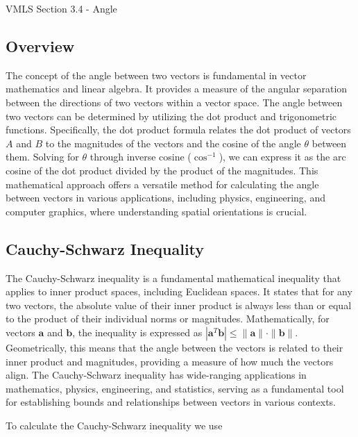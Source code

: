 \begin{notes}{VMLS Section 3.4 - Angle}
    \subsection*{Overview}

    The concept of the angle between two vectors is fundamental in vector mathematics and linear algebra. It provides a measure of the angular separation between the directions of two vectors within a vector space. The 
    angle between two vectors can be determined by utilizing the dot product and trigonometric functions. Specifically, the dot product formula relates the dot product of vectors \(A\) and \(B\) to the magnitudes of the 
    vectors and the cosine of the angle \(θ\) between them. Solving for \(θ\) through inverse cosine (\(\cos^{-1}\)), we can express it as the arc cosine of the dot product divided by the product of the magnitudes. This 
    mathematical approach offers a versatile method for calculating the angle between vectors in various applications, including physics, engineering, and computer graphics, where understanding spatial orientations is crucial.

    \subsection*{Cauchy-Schwarz Inequality}

    The Cauchy-Schwarz inequality is a fundamental mathematical inequality that applies to inner product spaces, including Euclidean spaces. It states that for any two vectors, the absolute value of their inner product is always 
    less than or equal to the product of their individual norms or magnitudes. Mathematically, for vectors \( \mathbf{a} \) and \( \mathbf{b} \), the inequality is expressed as \( | \mathbf{a}^{T}\mathbf{b} | \leq \| \mathbf{a} \| 
    \cdot \| \mathbf{b} \| \). Geometrically, this means that the angle between the vectors is related to their inner product and magnitudes, providing a measure of how much the vectors align. The Cauchy-Schwarz inequality has 
    wide-ranging applications in mathematics, physics, engineering, and statistics, serving as a fundamental tool for establishing bounds and relationships between vectors in various contexts.

    \begin{highlight}
        To calculate the Cauchy-Schwarz inequality we use


\end{highlight}
\end{notes}
